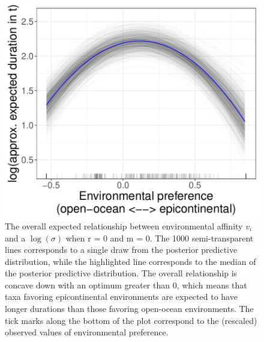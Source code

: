 \documentclass{article}
\begin{document}
\begin{figure}[ht]
  \centering
  \includegraphics[height = 0.5\textheight,width=\textwidth,keepaspectratio=true]{figure/env_effect_2}
  \caption{The overall expected relationship between environmental affinity \(v_{i}\) and a \(\log(\sigma)\) when r = 0 and m = 0. The 1000 semi-transparent lines corresponds to a single draw from the posterior predictive distribution, while the highlighted line corresponds to the median of the posterior predictive distribution. The overall relationship is concave down with an optimum greater than 0, which means that taxa favoring epicontinental environments are expected to have longer durations than those favoring open-ocean environments. The tick marks along the bottom of the plot correspond to the (rescaled) observed values of environmental preference.}
  \label{fig:env_mean_med}
\end{figure}
\end{document}
